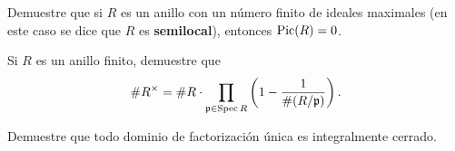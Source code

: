 \begin{ejercicio}
  Demuestre que si $R$ es un anillo con un número finito de ideales maximales
  (en este caso se dice que $R$ es \textbf{semilocal}), entonces $\operatorname{Pic} (R) = 0$.
\end{ejercicio}

\begin{ejercicio}
  Si $R$ es un anillo finito, demuestre que
  \[ \# R^\times = \# R \cdot \prod_{\mathfrak{p} \in \operatorname{Spec} R}
                    \left(1 - \frac{1}{\# (R/\mathfrak{p})}\right). \]
\end{ejercicio}

\begin{ejercicio}
  Demuestre que todo dominio de factorización única es integralmente cerrado.
\end{ejercicio}
